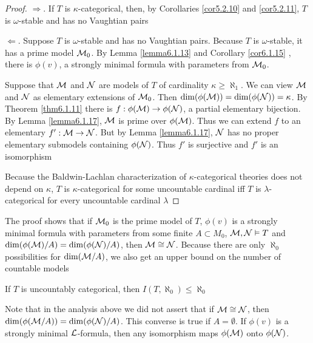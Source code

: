 \documentclass[11pt]{article}
\begin{document}
\begin{proof}
\(\Rightarrow\). If \(T\) is \(\kappa\)-categorical, then, by Corollaries \ref{cor5.2.10} and
\ref{cor5.2.11}, \(T\) is \(\omega\)-stable and has no Vaughtian pairs

\(\Leftarrow\). Suppose \(T\) is \(\omega\)-stable and has no Vaughtian pairs. Because \(T\) is \(\omega\)-stable, it has a
prime model \(\mathcal{M}_0\). By Lemma \ref{lemma6.1.13} and Corollary \ref{cor6.1.15} , there is \(\phi(v)\), a
strongly minimal formula with parameters from \(\mathcal{M}_0\).

Suppose that \(\mathcal{M}\) and \(\mathcal{N}\) are models of \(T\) of cardinality \(\kappa\ge\aleph_1\). We can view \(\mathcal{M}\)
and \(\mathcal{N}\) as elementary extensions of \(\mathcal{M}_0\). Then \(\dim(\phi(\mathcal{M}))=\dim(\phi(\mathcal{N}))=\kappa\). \label{Problem9}
By Theorem
\ref{thm6.1.11} there is \(f:\phi(\mathcal{M})\to\phi(\mathcal{N})\), a partial elementary bijection. By Lemma
\ref{lemma6.1.17}, \(\mathcal{M}\) is prime over \(\phi(\mathcal{M})\). Thus we can extend \(f\) to an
elementary \(f':\mathcal{M}\to\mathcal{N}\). But by Lemma \ref{lemma6.1.17}, \(\mathcal{N}\) has no proper elementary submodels
containing \(\phi(\mathcal{N})\). Thus \(f'\) is surjective and \(f'\) is an isomorphism

Because the Baldwin-Lachlan characterization of \(\kappa\)-categorical theories does not depend on
\(\kappa\), \(T\) is \(\kappa\)-categorical for some uncountable cardinal iff \(T\) is \(\lambda\)-categorical for every
uncountable cardinal \(\lambda\)
\end{proof}

The proof shows that if \(\mathcal{M}_0\) is the prime model of \(T\), \(\phi(v)\) is a strongly minimal
formula with parameters from some finite \(A\subset M_0\), \(\mathcal{M},\mathcal{N}\vDash T\)
and \(\dim(\phi(\mathcal{M})/A)=\dim(\phi(\mathcal{N})/A)\), then \(\mathcal{M}\cong\mathcal{N}\). Because there are only \(\aleph_0\) possibilities
for \(\dim(\mathcal{M}/A)\), we also get an upper bound on the number of countable models

\begin{proposition}[]
If \(T\) is uncountably categorical, then \(I(T,\aleph_0)\le\aleph_0\)
\end{proposition}

Note that in the analysis above we did not assert that if \(\mathcal{M}\cong\mathcal{N}\),
then \(\dim(\phi(\mathcal{M}/A))=\dim(\phi(\mathcal{N})/A)\). This converse is true if \(A=\emptyset\). If \(\phi(v)\) is a strongly
minimal \(\mathcal{L}\)-formula, then any isomorphism maps \(\phi(\mathcal{M})\) onto \(\phi(\mathcal{N})\).
\end{document}
